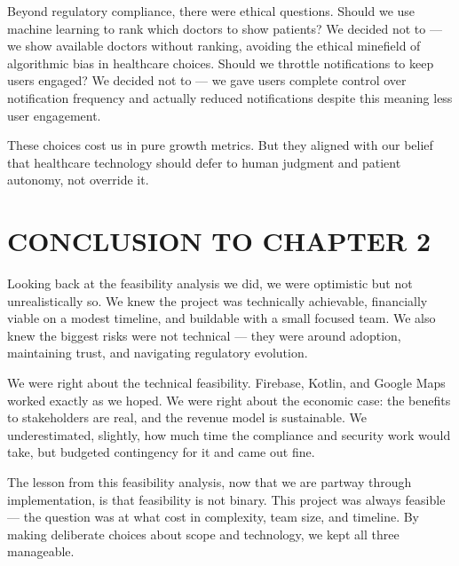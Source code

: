 \documentclass[12pt,a4paper]{report}
\begin{document}
\begin{itemize}
Beyond regulatory compliance, there were ethical questions. Should we use machine learning to rank which doctors to show patients? We decided not to — we show available doctors without ranking, avoiding the ethical minefield of algorithmic bias in healthcare choices. Should we throttle notifications to keep users engaged? We decided not to — we gave users complete control over notification frequency and actually reduced notifications despite this meaning less user engagement.

These choices cost us in pure growth metrics. But they aligned with our belief that healthcare technology should defer to human judgment and patient autonomy, not override it.

\section*{CONCLUSION TO CHAPTER 2}

Looking back at the feasibility analysis we did, we were optimistic but not unrealistically so. We knew the project was technically achievable, financially viable on a modest timeline, and buildable with a small focused team. We also knew the biggest risks were not technical — they were around adoption, maintaining trust, and navigating regulatory evolution.

We were right about the technical feasibility. Firebase, Kotlin, and Google Maps worked exactly as we hoped. We were right about the economic case: the benefits to stakeholders are real, and the revenue model is sustainable. We underestimated, slightly, how much time the compliance and security work would take, but budgeted contingency for it and came out fine.

The lesson from this feasibility analysis, now that we are partway through implementation, is that feasibility is not binary. This project was always feasible — the question was at what cost in complexity, team size, and timeline. By making deliberate choices about scope and technology, we kept all three manageable.

\vspace{1cm}


\end{itemize}
\end{document}

